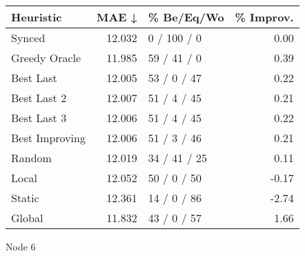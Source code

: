 \begin{tabular}{lrlr}
\toprule
\textbf{Heuristic} & \textbf{MAE ↓} & \textbf{\% Be/Eq/Wo} & \textbf{\% Improv.} \\
\midrule
            Synced &         12.032 &          0 / 100 / 0 &                0.00 \\
     Greedy Oracle &         11.985 &          59 / 41 / 0 &                0.39 \\
         Best Last &         12.005 &          53 / 0 / 47 &                0.22 \\
       Best Last 2 &         12.007 &          51 / 4 / 45 &                0.21 \\
       Best Last 3 &         12.006 &          51 / 4 / 45 &                0.22 \\
    Best Improving &         12.006 &          51 / 3 / 46 &                0.21 \\
            Random &         12.019 &         34 / 41 / 25 &                0.11 \\
             Local &         12.052 &          50 / 0 / 50 &               -0.17 \\
            Static &         12.361 &          14 / 0 / 86 &               -2.74 \\
            Global &         11.832 &          43 / 0 / 57 &                1.66 \\
\bottomrule
\end{tabular}
\caption{Node 6}
\label{tab:ds_iid_lr01_le2_bs4_6}
